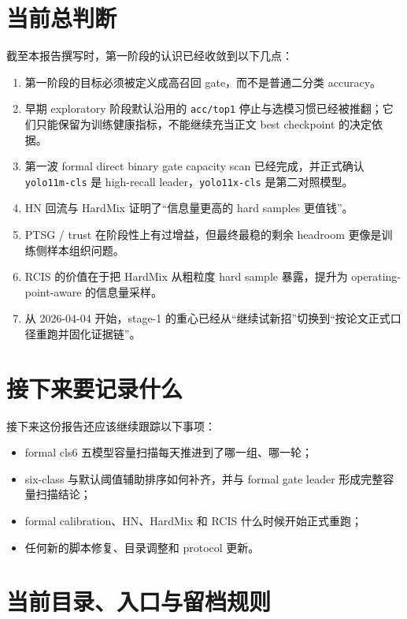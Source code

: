 \documentclass[UTF8,12pt]{ctexart}
\begin{document}
\section{当前总判断}
截至本报告撰写时，第一阶段的认识已经收敛到以下几点：
\begin{enumerate}[label=\arabic*.]
    \item 第一阶段的目标必须被定义成高召回 gate，而不是普通二分类 accuracy。
    \item 早期 exploratory 阶段默认沿用的 \texttt{acc/top1} 停止与选模习惯已经被推翻；它们只能保留为训练健康指标，不能继续充当正文 best checkpoint 的决定依据。
    \item 第一波 formal direct binary gate capacity scan 已经完成，并正式确认 \texttt{yolo11m-cls} 是 high-recall leader，\texttt{yolo11x-cls} 是第二对照模型。
    \item HN 回流与 HardMix 证明了“信息量更高的 hard samples 更值钱”。
    \item PTSG / trust 在阶段性上有过增益，但最终最稳的剩余 headroom 更像是训练侧样本组织问题。
    \item RCIS 的价值在于把 HardMix 从粗粒度 hard sample 暴露，提升为 operating-point-aware 的信息量采样。
    \item 从 2026-04-04 开始，stage-1 的重心已经从“继续试新招”切换到“按论文正式口径重跑并固化证据链”。
\end{enumerate}

\section{接下来要记录什么}
接下来这份报告还应该继续跟踪以下事项：
\begin{itemize}
    \item formal cls6 五模型容量扫描每天推进到了哪一组、哪一轮；
    \item six-class 与默认阈值辅助排序如何补齐，并与 formal gate leader 形成完整容量扫描结论；
    \item formal calibration、HN、HardMix 和 RCIS 什么时候开始正式重跑；
    \item 任何新的脚本修复、目录调整和 protocol 更新。
\end{itemize}

\section{当前目录、入口与留档规则}
\end{document}
